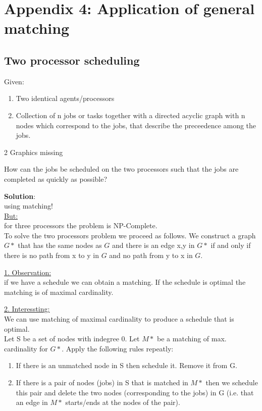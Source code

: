 \chapter*{ Appendix 4: Application of general matching}

\section{Two processor scheduling}

Given:\\
\begin{enumerate}
  \item Two identical agents/processors
  \item Collection of n jobs or tasks together with a directed acyclic graph with n nodes which correspond to the jobs, that describe the preceedence among the jobs.
\end{enumerate}


\begin{example}
2 Graphics missing

\end{example}

How can the jobs be scheduled on the two processors such that the jobs are completed as quickly as possible?

\textbf{Solution}:\\
using matching!\\
\underline{But:}\\
for three processors the problem is NP-Complete.\\

To solve the two processors problem we proceed as follows. We construct a graph $G*$ that has the same nodes as $G$ and there is an edge {x,y} in $G*$ if and only if there is no path from x to y in $G$ and no path from y to x in $G$.

\underline{1. Observation:}\\
if we have a schedule we can obtain a matching. If the schedule is optimal the matching is of maximal cardinality.

\underline{2. Interessting:}\\
We can use matching of maximal cardinality to produce a schedule that is optimal.\\

Let S be a set of nodes with indegree 0. Let $M*$ be a matching of max. cardinality for $G*$. Apply the following rules repeatly:\\
\begin{enumerate}
  \item If there is an unmatched node in S then schedule it. Remove it from G.
  \item If there is a pair of nodes (jobs) in S that is matched in $M*$ then we schedule this pair and delete the two nodes (corresponding to the jobs) in G (i.e. that an edge in $M*$ starts/ends at the nodes of the pair).
\end{enumerate}

